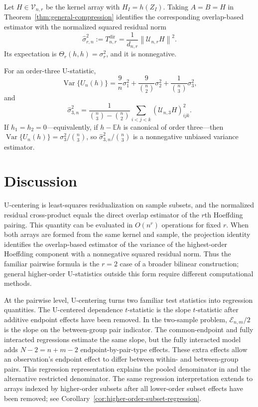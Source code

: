\documentclass[11pt]{article}
\theoremstyle{plain}
\theoremstyle{definition}
\theoremstyle{remark}
\newcommand{\E}{\mathbb E}
\newcommand{\Var}{\operatorname{Var}}
\newcommand{\cU}{\mathcal U}
\newcommand{\cV}{\mathcal V}
\newcommand{\norm}[1]{\left\lVert #1\right\rVert}
\begin{document}
\begin{samepage}
Let $H\in\cV_{n,r}$ be the kernel array with $H_I=h(Z_I)$.  Taking $A=B=H$
in Theorem~\ref{thm:general-compression} identifies the corresponding
overlap-based estimator with the normalized squared residual norm
\begin{equation*}
 \widehat\sigma_{r,n}^2
 :=T_{n,r}^{\mathrm{dir}}
 =\frac{1}{d_{n,r}}\norm{\cU_{n,r}H}^2.
\end{equation*}
Its expectation is $\Theta_r(h,h)=\sigma_r^2$, and it is nonnegative.
\end{samepage}

For an order-three U-statistic,
\begin{equation*}
 \Var\{U_n(h)\}
 =\frac{9}{n}\sigma_1^2
  +\frac{9}{\binom n2}\sigma_2^2
  +\frac{1}{\binom n3}\sigma_3^2,
\end{equation*}
and
\begin{equation*}
 \widehat\sigma_{3,n}^2
 =\frac{1}{\binom n3-\binom n2}
   \sum_{i<j<k}(\cU_{n,3}H)_{ijk}^2.
\end{equation*}
If $h_1=h_2=0$---equivalently, if $h-\E h$ is canonical of order three---then
$\Var\{U_n(h)\}=\sigma_3^2/\binom n3$, so
$\widehat\sigma_{3,n}^2/\binom n3$ is a nonnegative unbiased variance
estimator.



\section{Discussion}
\label{sec:discussion}
U-centering is least-squares residualization on sample subsets, and the
normalized residual cross-product equals the direct overlap estimator of the
$r$th Hoeffding pairing.  This quantity can be evaluated in $O(n^r)$
operations for fixed $r$.  When both arrays are formed from the same kernel
and sample, the projection identity identifies the overlap-based estimator of
the variance of the highest-order Hoeffding component with a nonnegative
squared residual norm.  Thus the familiar pairwise formula is the
$r=2$ case of a broader bilinear construction; general higher-order
U-statistics outside this form require different computational methods.

At the pairwise level, U-centering turns two familiar test
statistics into regression quantities.  The U-centered dependence
$t$-statistic is the slope $t$-statistic after additive endpoint effects have
been removed.  In the two-sample problem, $\mathcal E_{n,m}/2$ is the slope on
the between-group pair indicator.  The common-endpoint and fully interacted
regressions estimate the same slope, but the fully interacted model adds
$N-2=n+m-2$ endpoint-by-pair-type effects.  These extra effects allow an
observation's endpoint effect to differ between within- and between-group
pairs.  This regression representation explains the pooled denominator in
\citet{ChakrabortyZhang2021} and the alternative restricted denominator.  The
same regression interpretation extends to arrays indexed by
higher-order subsets after all lower-order subset effects have been removed;
see Corollary~\ref{cor:higher-order-subset-regression}.
\end{document}
